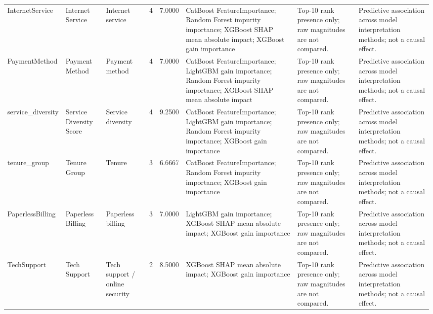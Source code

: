 \begin{tabular}{lllrrlll}
InternetService & Internet Service & Internet service & 4 & 7.0000 & CatBoost FeatureImportance; Random Forest impurity importance; XGBoost SHAP mean absolute impact; XGBoost gain importance & Top-10 rank presence only; raw magnitudes are not compared. & Predictive association across model interpretation methods; not a causal effect. \\
PaymentMethod & Payment Method & Payment method & 4 & 7.0000 & CatBoost FeatureImportance; LightGBM gain importance; Random Forest impurity importance; XGBoost SHAP mean absolute impact & Top-10 rank presence only; raw magnitudes are not compared. & Predictive association across model interpretation methods; not a causal effect. \\
service_diversity & Service Diversity Score & Service diversity & 4 & 9.2500 & CatBoost FeatureImportance; LightGBM gain importance; Random Forest impurity importance; XGBoost gain importance & Top-10 rank presence only; raw magnitudes are not compared. & Predictive association across model interpretation methods; not a causal effect. \\
tenure_group & Tenure Group & Tenure & 3 & 6.6667 & CatBoost FeatureImportance; Random Forest impurity importance; XGBoost gain importance & Top-10 rank presence only; raw magnitudes are not compared. & Predictive association across model interpretation methods; not a causal effect. \\
PaperlessBilling & Paperless Billing & Paperless billing & 3 & 7.0000 & LightGBM gain importance; XGBoost SHAP mean absolute impact; XGBoost gain importance & Top-10 rank presence only; raw magnitudes are not compared. & Predictive association across model interpretation methods; not a causal effect. \\
TechSupport & Tech Support & Tech support / online security & 2 & 8.5000 & XGBoost SHAP mean absolute impact; XGBoost gain importance & Top-10 rank presence only; raw magnitudes are not compared. & Predictive association across model interpretation methods; not a causal effect. \\
\bottomrule
\end{tabular}
